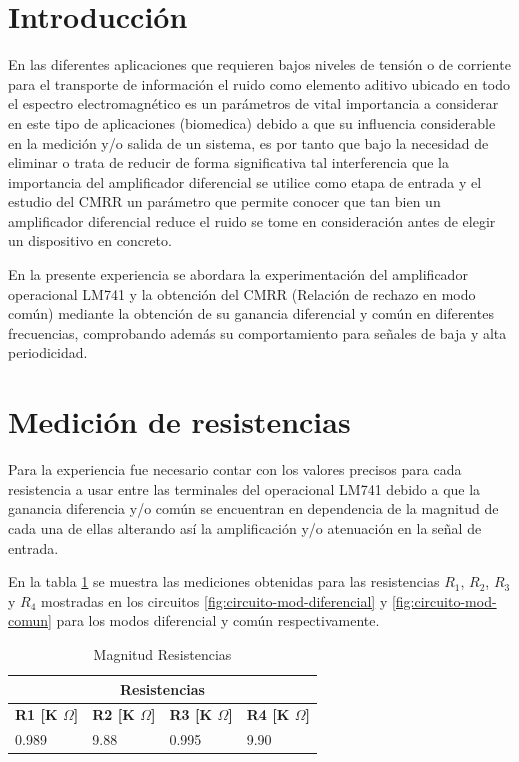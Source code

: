 \section*{Introducción}

En las diferentes aplicaciones que requieren bajos niveles de tensión o de corriente para el transporte de información el ruido como elemento aditivo ubicado en todo el espectro electromagnético es un parámetros de vital importancia a considerar en este tipo de aplicaciones (biomedica) debido a que su influencia considerable en la medición y/o salida de un sistema, es por tanto que bajo la necesidad de eliminar o trata de reducir de forma significativa tal interferencia que la importancia del amplificador diferencial se utilice como etapa de entrada y el estudio del CMRR un parámetro que permite conocer que tan bien un amplificador diferencial reduce el ruido se tome en consideración antes de elegir un dispositivo en concreto.

En la presente experiencia se abordara la experimentación del amplificador operacional LM741 y la obtención del CMRR (Relación de rechazo en modo común) mediante la obtención de su ganancia diferencial y común en diferentes frecuencias, comprobando además su comportamiento para señales de baja y alta periodicidad.

\section{Medición de resistencias}

Para la experiencia fue necesario contar con los valores precisos para cada resistencia a usar entre las terminales del operacional LM741 debido a que la ganancia diferencia y/o común se encuentran en dependencia de la magnitud de cada una de ellas alterando así la amplificación y/o atenuación en la señal de entrada.

En la tabla \ref{tab:mediciones-resistencias} se muestra las mediciones obtenidas para las resistencias $R_1$, $R_2$, $R_3$ y $R_4$ mostradas en los circuitos \ref{fig:circuito-mod-diferencial} y \ref{fig:circuito-mod-comun} para los modos diferencial y común respectivamente.

\begin{table}[h]
	\centering
	\begin{tabular}{|llll|}
		\hline
		\multicolumn{4}{|c|}{\textbf{Resistencias}}                                                                                                           \\ \hline
		\multicolumn{1}{|l|}{\textbf{R1 {[}K $\Omega${]}}} & \multicolumn{1}{l|}{\textbf{R2 {[}K $\Omega${]}}} & \multicolumn{1}{l|}{\textbf{R3 {[}K $\Omega${]}}} & \textbf{R4 {[}K $\Omega${]}} \\ \hline
		\multicolumn{1}{|l|}{0.989}               & \multicolumn{1}{l|}{9.88}                & \multicolumn{1}{l|}{0.995}               & 9.90                \\ \hline
	\end{tabular}
	\caption{Magnitud Resistencias}
	\label{tab:mediciones-resistencias}
\end{table}

